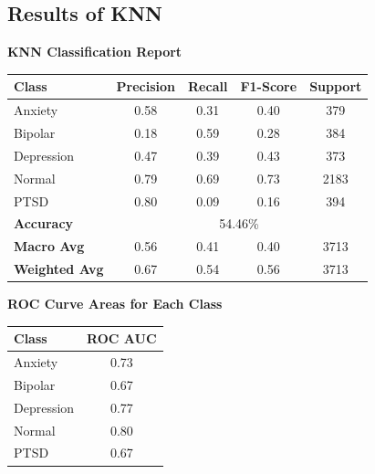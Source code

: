 
\subsection{Results of KNN}

\begin{center}
    \textbf{KNN Classification Report} \\[0.5em]
    \begin{tabular}{|l|c|c|c|c|}
        \hline
        \textbf{Class} & \textbf{Precision} & \textbf{Recall} & \textbf{F1-Score} & \textbf{Support} \\ \hline
        Anxiety        & 0.58               & 0.31            & 0.40              & 379              \\ \hline
        Bipolar        & 0.18               & 0.59            & 0.28              & 384              \\ \hline
        Depression     & 0.47               & 0.39            & 0.43              & 373              \\ \hline
        Normal         & 0.79               & 0.69            & 0.73              & 2183             \\ \hline
        PTSD           & 0.80               & 0.09            & 0.16              & 394              \\ \hline
        \textbf{Accuracy} & \multicolumn{4}{|c|}{54.46\%} \\ \hline
        \textbf{Macro Avg} & 0.56            & 0.41            & 0.40              & 3713             \\ \hline
        \textbf{Weighted Avg} & 0.67         & 0.54            & 0.56              & 3713             \\ \hline
    \end{tabular}
\end{center}

\vspace{0.25em}
\pagebreak
\begin{center}
    \textbf{ROC Curve Areas for Each Class} \\[0.5em]
    \begin{tabular}{|l|c|}
        \hline
        \textbf{Class}  & \textbf{ROC AUC} \\ \hline
        Anxiety         & 0.73            \\ \hline
        Bipolar         & 0.67            \\ \hline
        Depression      & 0.77            \\ \hline
        Normal          & 0.80            \\ \hline
        PTSD            & 0.67            \\ \hline
    \end{tabular}
\end{center}

